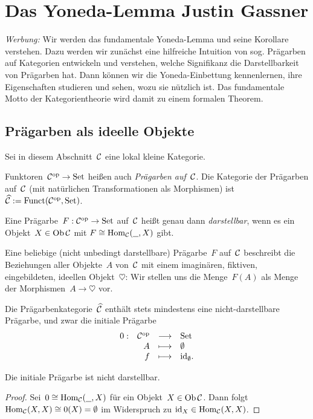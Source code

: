 \section[Das Yoneda-Lemma]{Das Yoneda-Lemma \hfill \small Justin Gassner}

\emph{Werbung:} Wir werden das fundamentale Yoneda-Lemma und seine Korollare
verstehen. Dazu werden wir zunächst eine hilfreiche Intuition von sog. Prägarben auf
Kategorien entwickeln und verstehen, welche Signifikanz die Darstellbarkeit von
Prägarben hat. Dann können wir die Yoneda-Einbettung kennenlernen, ihre
Eigenschaften studieren und sehen, wozu sie nützlich ist. Das fundamentale
Motto der Kategorientheorie wird damit zu einem formalen Theorem.


\subsection{Prägarben als ideelle Objekte}

Sei in diesem Abschnitt~$\mathcal{C}$ eine lokal kleine Kategorie.

\begin{defn}Funktoren~$\mathcal{C}^{\mathrm{op}} \to \mathrm{Set}$ heißen auch \emph{Prägarben
auf~$\mathcal{C}$}. Die Kategorie der Prägarben auf~$\mathcal{C}$ (mit natürlichen
Transformationen als Morphismen) ist~$\widehat{\mathcal{C}} := \mathrm{Funct}(\mathcal{C}^{\mathrm{op}},\mathrm{Set})$.
\end{defn}


\begin{defn}Eine Prägarbe~$F:\mathcal{C}^{\mathrm{op}}\to\mathrm{Set}$ auf~$\mathcal{C}$ heißt genau dann
\emph{darstellbar}, wenn es ein Objekt~$X \in \operatorname{Ob}\mathcal{C}$ mit $F \cong
\mathrm{Hom}_{\mathcal{C}}(\underline{\ \ },X)$ gibt.\end{defn}

\begin{motto}\label{praegarbeideell}%
Eine beliebige (nicht unbedingt darstellbare) Prägarbe~$F$
auf~$\mathcal{C}$ beschreibt die Beziehungen aller Objekte~$A$ von~$\mathcal{C}$ mit einem
imaginären, fiktiven, eingebildeten, ideellen Objekt~$\heartsuit$: Wir stellen uns die
Menge~$F(A)$ als Menge der Morphismen~$A \to \heartsuit$ vor.\end{motto}

Die Prägarbenkategorie~$\widehat{\mathcal{C}}$ enthält stets mindestens eine
nicht-darstellbare Prägarbe, und zwar die initiale Prägarbe
\[ \begin{array}{@{}rrcl@{}}
  0 : & \C^\op &\longrightarrow& \Set \\
  & A &\longmapsto& \emptyset \\
  & f &\longmapsto& \id_\emptyset.
\end{array} \]
\begin{prop}Die initiale Prägarbe ist nicht darstellbar.\end{prop}
\begin{proof}Sei~$0 \cong \mathrm{Hom}_{\mathcal{C}}(\underline{\ \ },X)$ für ein Objekt~$X\in\operatorname{Ob}\mathcal{C}$.
Dann folgt~$\mathrm{Hom}_{\mathcal{C}}(X,X) \cong 0(X) = \emptyset$ im Widerspruch zu
$\mathrm{id}_X \in \mathrm{Hom}_{\mathcal{C}}(X,X)$.\end{proof}


